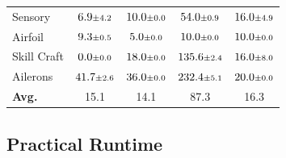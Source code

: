 \begin{table}[t]
\begin{tabular}{lcccc}
        Sensory & $6.9 \text{\scriptsize$\pm$4.2}$ & $10.0 \text{\scriptsize$\pm$0.0}$ & $54.0 \text{\scriptsize$\pm$0.9}$ & $16.0 \text{\scriptsize$\pm$4.9}$ \\
        Airfoil & $9.3 \text{\scriptsize$\pm$0.5}$ & $5.0 \text{\scriptsize$\pm$0.0}$ & $10.0 \text{\scriptsize$\pm$0.0}$ & $10.0 \text{\scriptsize$\pm$0.0}$ \\
        Skill Craft & $0.0 \text{\scriptsize$\pm$0.0}$ & $18.0 \text{\scriptsize$\pm$0.0}$ & $135.6 \text{\scriptsize$\pm$2.4}$ & $16.0 \text{\scriptsize$\pm$8.0}$ \\
        Ailerons & $41.7 \text{\scriptsize$\pm$2.6}$ & $36.0 \text{\scriptsize$\pm$0.0}$ & $232.4 \text{\scriptsize$\pm$5.1}$ & $20.0 \text{\scriptsize$\pm$0.0}$ \\
      \midrule
      \textbf{Avg.} & 15.1 & 14.1 & 87.3 & 16.3 \\
      \bottomrule
    \end{tabular}
\end{table}

\subsection{Practical Runtime}

